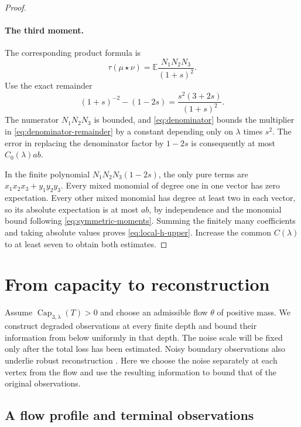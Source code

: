 \documentclass[11pt]{article}
\numberwithin{equation}{section}
\newcommand{\E}{\mathbb E}
\newcommand{\Capacity}{\operatorname{Cap}}
\begin{document}
\begin{proof}
\paragraph{The third moment.}
The corresponding product formula is
\[
 \tau(\mu\star\nu)=\E\frac{N_1N_2N_3}{(1+s)^2}.
\]
Use the exact remainder
\begin{equation}\label{eq:denominator-remainder}
 (1+s)^{-2}-(1-2s)=\frac{s^2(3+2s)}{(1+s)^2}.
\end{equation}
The numerator $N_1N_2N_3$ is bounded, and
\eqref{eq:denominator} bounds the multiplier in
\eqref{eq:denominator-remainder} by a constant depending only
on $\lambda$ times $s^2$. The error in replacing the denominator
factor by $1-2s$ is consequently at most $C_0(\lambda)ab$.

In the finite polynomial $N_1N_2N_3(1-2s)$, the only pure
terms are $x_1x_2x_3+y_1y_2y_3$. Every mixed monomial of degree
one in one vector has zero expectation. Every other mixed
monomial has degree at least two in each vector, so its absolute
expectation is at most $ab$, by independence and the monomial
bound following \eqref{eq:symmetric-moments}. Summing the finitely
many coefficients and taking absolute values proves
\eqref{eq:local-h-upper}. Increase the common $C(\lambda)$ to
at least seven to obtain both estimates.
\end{proof}

\section{From capacity to reconstruction}
\label{sec:sufficiency}

Assume $\Capacity_{3,\lambda}(T)>0$ and choose an admissible flow
$\theta$ of positive mass. We construct degraded observations at
every finite depth and bound their information from below
uniformly in that depth. The noise scale will be fixed only after
the total loss has been estimated.
Noisy boundary observations also underlie robust reconstruction
\cite{JM04}. Here we choose the noise separately at each vertex
from the flow and use the resulting information to bound that
of the original observations.

\subsection{A flow profile and terminal observations}
\end{document}
